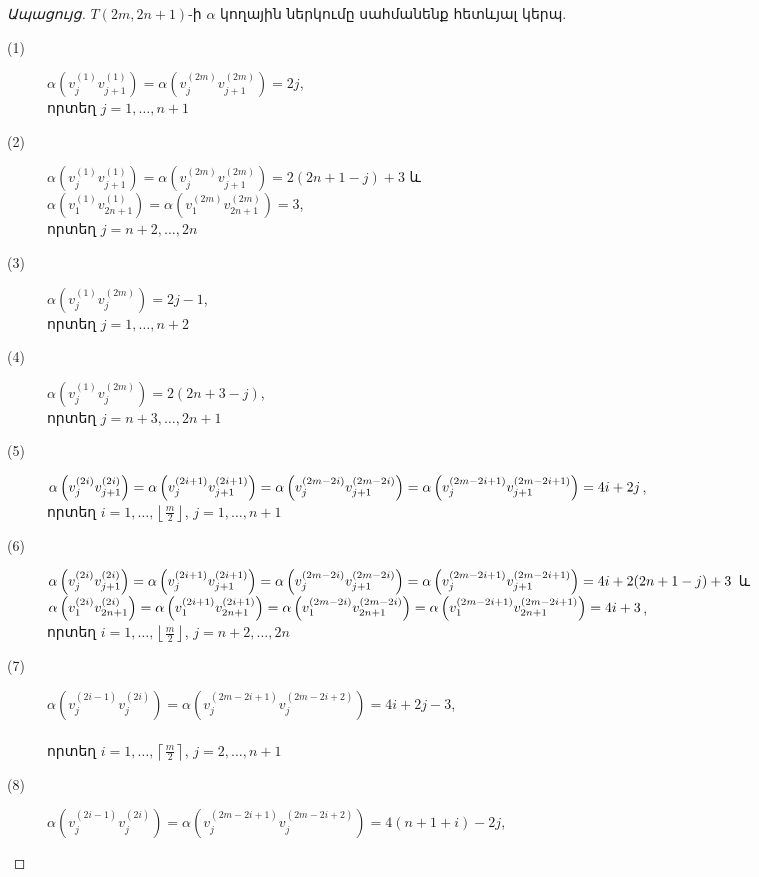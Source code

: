 \begin{hide}
\begin{proof}[Ապացույց]
$T(2m,2n+1)$-ի $\alpha$ կողային ներկումը սահմանենք հետևյալ կերպ.
\begin{description}
\item[(1)] 
$\alpha\left(v_{j}^{(1)}v_{j+1}^{(1)}\right)=\alpha\left(v_{j}^{(2m)}v_{j+1}^{(2m)}\right)=2j$,\\
որտեղ $j=1,\ldots,n+1$
\item[(2)]
$\alpha\left(v_{j}^{(1)}v_{j+1}^{(1)}\right)=\alpha\left(v_{j}^{(2m)}v_{j+1}^{(2m)}\right)=2(2n+1-j)+3$ և\\
$\alpha\left(v_{1}^{(1)}v_{2n+1}^{(1)}\right)=\alpha\left(v_{1}^{(2m)}v_{2n+1}^{(2m)}\right)=3$, \\
 որտեղ $j=n+2,\ldots,2n$
\item[(3)] 
$\alpha\left(v_{j}^{(1)}v_{j}^{(2m)}\right)=2j-1$, \\ որտեղ $j=1,\ldots,n+2$
\item[(4)] 
$\alpha\left(v_{j}^{(1)}v_{j}^{(2m)}\right)=2(2n+3-j)$, \\ որտեղ $j=n+3,\ldots,2n+1$
\item[(5)] 
$\alpha\left(v_{j}^{(2i)}v_{j+1}^{(2i)}\right)=\alpha\left(v_{j}^{(2i+1)}v_{j+1}^{(2i+1)}\right)=\alpha\left(v_{j}^{(2m-2i)}v_{j+1}^{(2m-2i)}\right)=\\
\alpha\left(v_{j}^{(2m-2i+1)}v_{j+1}^{(2m-2i+1)}\right)=4i+2j$, \\ որտեղ $i=1,\ldots,\left\lfloor\frac{m}{2}\right\rfloor$, $j=1,\ldots,n+1$
\item[(6)] 
$\alpha\left(v_{j}^{(2i)}v_{j+1}^{(2i)}\right)=\alpha\left(v_{j}^{(2i+1)}v_{j+1}^{(2i+1)}\right)=\alpha\left(v_{j}^{(2m-2i)}v_{j+1}^{(2m-2i)}\right)=\\
\alpha\left(v_{j}^{(2m-2i+1)}v_{j+1}^{(2m-2i+1)}\right)=4i+2(2n+1-j)+3$
և \\
$\alpha\left(v_{1}^{(2i)}v_{2n+1}^{(2i)}\right)=\alpha\left(v_{1}^{(2i+1)}v_{2n+1}^{(2i+1)}\right)=\alpha\left(v_{1}^{(2m-2i)}v_{2n+1}^{(2m-2i)}\right)=\\
\alpha\left(v_{1}^{(2m-2i+1)}v_{2n+1}^{(2m-2i+1)}\right)=4i+3$, 
\\ որտեղ $i=1,\ldots,\left\lfloor\frac{m}{2}\right\rfloor$, $j=n+2,\ldots,2n$
\item[(7)] 
$\alpha\left(v_{j}^{(2i-1)}v_{j}^{(2i)}\right)=\alpha\left(v_{j}^{(2m-2i+1)}v_{j}^{(2m-2i+2)}\right)=4i+2j-3$,\\
\\ որտեղ $i=1,\ldots,\left\lceil\frac{m}{2}\right\rceil$, $j=2,\ldots,n+1$
\item[(8)] 
$\alpha\left(v_{j}^{(2i-1)}v_{j}^{(2i)}\right)=\alpha\left(v_{j}^{(2m-2i+1)}v_{j}^{(2m-2i+2)}\right)=4(n+1+i)-2j$,\\ 

\end{description}
\end{proof}
\end{hide}
